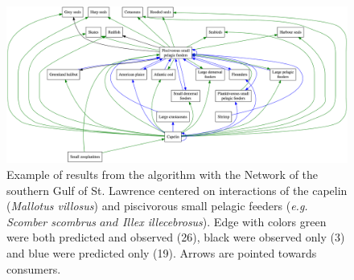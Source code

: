 \documentclass[letterpaper]{article}
\begin{document}
\newpage
    \begin{figure}[h!]
      \centering\includegraphics[width=\textwidth]{SGSL.png}
      \caption{Example of results from the algorithm with the Network of the southern Gulf of St. Lawrence \citep{Savenkoff2004} centered on interactions of the capelin (\textit{Mallotus villosus}) and piscivorous small pelagic feeders (\textit{e.g. Scomber scombrus $and$ Illex illecebrosus}). Edge with colors green were both predicted and observed (26), black were observed only (3) and blue were predicted only (19). Arrows are pointed towards consumers.}
      \label{fig:SGSL}
    \end{figure}
\end{document}
